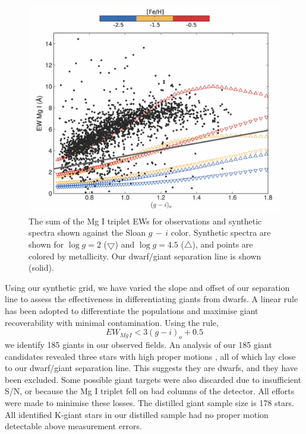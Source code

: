 \begin{figure}[h]
	\includegraphics[width=\columnwidth]{chapter1/dwarfgiant.pdf}
	\caption{The sum of the Mg I triplet EWs for observations and synthetic spectra shown against the Sloan $g\,-\,i$ color. Synthetic spectra are shown for $\log{g} = 2$ ($\bigtriangledown$) and $\log{g} = 4.5$ ($\bigtriangleup$), and points are colored by metallicity. Our dwarf/giant separation line is shown (solid). }
	\label{fig:dwarf-giant-separation}
\end{figure}

 Using our synthetic grid, we have varied the slope and offset of our separation line to assess the effectiveness in differentiating giants from dwarfs.  A linear rule has been adopted to differentiate the populations and maximise giant recoverability with minimal contamination. Using the rule,
\begin{equation}
	EW_{Mg\,I} < 3(g-i)_o + 0.5
\end{equation}
\noindent we identify 185 giants in our observed fields. An analysis of our 185 giant candidates revealed three stars with high proper motions \citep[PPMXL Catalog][]{Roser;et-al_2010}, all of which lay close to our dwarf/giant separation line. This suggests they are dwarfs, and they have been excluded. Some possible giant targets were also discarded due to insufficient S/N, or because the Mg I triplet fell on bad columns of the detector. All efforts were made to minimise these losses. The distilled giant sample size is 178 stars.  All identified K-giant stars in our distilled sample had no proper motion detectable above measurement errors.


